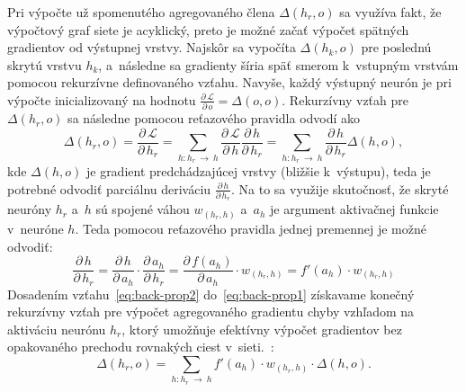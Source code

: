     Pri výpočte už spomenutého agregovaného člena $\Delta (h_r,o)$ sa využíva fakt, že výpočtový graf siete je acyklický, preto je možné začať výpočet spätných gradientov od výstupnej vrstvy. Najskôr sa vypočíta $\Delta (h_k,o)$ pre poslednú skrytú vrstvu $h_k$, a~následne sa gradienty šíria späť smerom k~vstupným vrstvám pomocou rekurzívne definovaného vzťahu. Navyše, každý výstupný neurón je pri výpočte inicializovaný na hodnotu $\frac{\partial\, \mathcal{L}}{\partial\, o} = \Delta (o,o)$. Rekurzívny vzťah pre $\Delta (h_r,o)$ sa následne pomocou reťazového pravidla odvodí ako
    \begin{equation}
      \Delta (h_r,o) = \frac{\partial\, \mathcal{L}}{\partial\, h_r} = \sum_{h:h_r \:\rightarrow\: h} \frac{\partial\, \mathcal{L}}{\partial\, h} \frac{\partial\, h}{\partial\, h_r} = \sum_{h:h_r \:\rightarrow\: h} \frac{\partial\, h}{\partial\, h_r} \Delta (h,o),
      \label{eq:back-prop1}
    \end{equation}
    kde $\Delta (h,o)$ je gradient predchádzajúcej vrstvy (bližšie k~výstupu), teda je potrebné odvodiť parciálnu deriváciu $\frac{\partial\, h}{\partial\, h_r}$. Na to sa využije skutočnosť, že skryté neuróny $h_r$ a~$h$ sú spojené váhou $w_{(h_r,h)}$ a~$a_h$ je argument aktivačnej funkcie v~neuróne $h$. Teda pomocou reťazového pravidla jednej premennej je možné odvodiť:
    \begin{equation}
      \frac{\partial\, h}{\partial\, h_r} = \frac{\partial\, h}{\partial\, a_h} \cdot \frac{\partial\, a_h}{\partial\, h_r} = \frac{\partial\, f(a_h)}{\partial\, a_h} \cdot w_{(h_r, h)} = f'(a_h) \cdot w_{(h_r, h)}
      \label{eq:back-prop2}
    \end{equation}
    Dosadením vzťahu~\ref{eq:back-prop2} do~\ref{eq:back-prop1} získavame konečný rekurzívny vzťah pre výpočet agregovaného gradientu chyby vzhľadom na aktiváciu neurónu $h_r$, ktorý umožňuje efektívny výpočet gradientov bez opakovaného prechodu rovnakých ciest v~sieti.~\cite{aggarwalNeuralNetworksDeep2018}:
    \begin{equation}
      \Delta (h_r,o) = \sum_{h:h_r \:\rightarrow\: h} f'(a_h) \cdot w_{(h_r,h)} \cdot \Delta (h,o).
      \label{eq:back-prop3}
    \end{equation}

